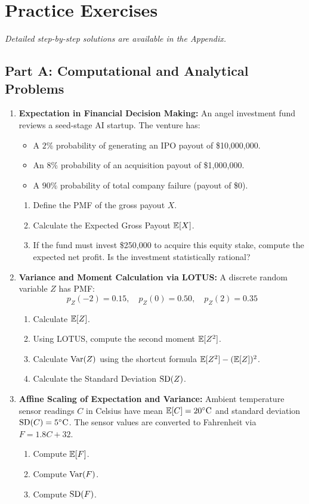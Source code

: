 \newpage
\section{Practice Exercises}
\textit{Detailed step-by-step solutions are available in the Appendix.}

\subsection*{Part A: Computational and Analytical Problems}

\begin{enumerate}
    \item \textbf{Expectation in Financial Decision Making:} An angel investment fund reviews a seed-stage AI startup. The venture has:
    \begin{itemize}
        \item A $2\%$ probability of generating an IPO payout of \$10,000,000.
        \item An $8\%$ probability of an acquisition payout of \$1,000,000.
        \item A $90\%$ probability of total company failure (payout of \$0).
    \end{itemize}
    \begin{enumerate}
        \item Define the PMF of the gross payout $X$.
        \item Calculate the Expected Gross Payout $\mathbb{E}[X]$.
        \item If the fund must invest \$250,000 to acquire this equity stake, compute the expected net profit. Is the investment statistically rational?
    \end{enumerate}

    \item \textbf{Variance and Moment Calculation via LOTUS:} A discrete random variable $Z$ has PMF:
    $$p_Z(-2) = 0.15, \quad p_Z(0) = 0.50, \quad p_Z(2) = 0.35$$
    \begin{enumerate}
        \item Calculate $\mathbb{E}[Z]$.
        \item Using LOTUS, compute the second moment $\mathbb{E}[Z^2]$.
        \item Calculate $\operatorname{Var}(Z)$ using the shortcut formula $\mathbb{E}[Z^2] - (\mathbb{E}[Z])^2$.
        \item Calculate the Standard Deviation $\operatorname{SD}(Z)$.
    \end{enumerate}

    \item \textbf{Affine Scaling of Expectation and Variance:} Ambient temperature sensor readings $C$ in Celsius have mean $\mathbb{E}[C] = 20^\circ\text{C}$ and standard deviation $\operatorname{SD}(C) = 5^\circ\text{C}$. The sensor values are converted to Fahrenheit via $F = 1.8 C + 32$.
    \begin{enumerate}
        \item Compute $\mathbb{E}[F]$.
        \item Compute $\operatorname{Var}(F)$.
        \item Compute $\operatorname{SD}(F)$.
    \end{enumerate}


\end{enumerate}
